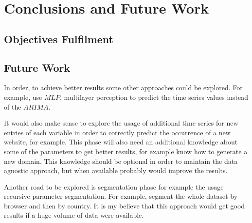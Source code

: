 \chapter{Conclusions and Future Work} \label{chap:concl}

\section*{}

\section{Objectives Fulfilment}


\section{Future Work}

In order, to achieve better results some other approaches could be explored. For
example, use $MLP$, multilayer perception to predict the time series values
instead of the $ARIMA$.

It would also make sense to explore the usage of additional time series for new
entries of each variable in order to correctly predict the occurrence of a new
website, for example. This phase will also need an additional knowledge about
some of the parameters to get better results, for example know how to generate a
new domain. This knowledge should be optional in order to maintain the data
agnostic approach, but when available probably would improve the results.

Another road to be explored is segmentation phase for example the usage
recursive parameter segmentation. For example, segment the whole dataset by
browser and then by country. It is my believe that this approach would get good
results if a huge volume of data were available.

